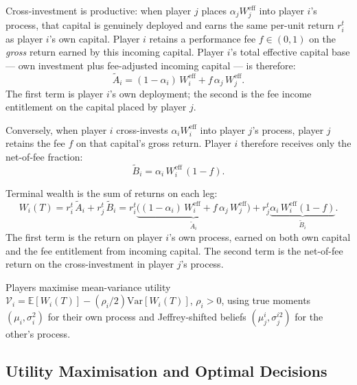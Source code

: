 \documentclass[12pt,a4paper]{article}
\newcommand{\E}{\mathbb{E}}
\newcommand{\Var}{\mathrm{Var}}
\newcommand{\1}{\mathbf{1}}
\begin{document}
Cross-investment is productive: when player $j$ places
$\alpha_j W_j^{\mathrm{eff}}$ into player $i$'s process, that
capital is genuinely deployed and earns the same per-unit return
$r_i^t$ as player $i$'s own capital. Player $i$ retains a
performance fee $f \in (0,1)$ on the \emph{gross} return earned
by this incoming capital. Player $i$'s total effective capital
base --- own investment plus fee-adjusted incoming capital ---
is therefore:
\begin{equation}
  \tilde{A}_i = (1-\alpha_i)\,W_i^{\mathrm{eff}}
                + f\,\alpha_j\,W_j^{\mathrm{eff}}.
  \label{eq:Atilde}
\end{equation}
The first term is player $i$'s own deployment; the second is the
fee income entitlement on the capital placed by player $j$.

Conversely, when player $i$ cross-invests $\alpha_i W_i^{\mathrm{eff}}$
into player $j$'s process, player $j$ retains the fee $f$ on
that capital's gross return. Player $i$ therefore receives only
the net-of-fee fraction:
\begin{equation}
  \tilde{B}_i = \alpha_i\,W_i^{\mathrm{eff}}\,(1-f).
  \label{eq:Btilde}
\end{equation}

Terminal wealth is the sum of returns on each leg:
\begin{equation}
  W_i(T) = r_i^t\,\tilde{A}_i + r_j^t\,\tilde{B}_i
          = r_i^t\!\underbrace{\bigl((1-\alpha_i)\,W_i^{\mathrm{eff}}
              + f\,\alpha_j\,W_j^{\mathrm{eff}}\bigr)}_{\tilde{A}_i}
          + r_j^t\!\underbrace{\alpha_i\,W_i^{\mathrm{eff}}(1-f)}_{\tilde{B}_i}.
  \label{eq:wealth}
\end{equation}
The first term is the return on player $i$'s own process, earned
on both own capital and the fee entitlement from incoming capital.
The second term is the net-of-fee return on the cross-investment
in player $j$'s process.

Players maximise mean-variance utility
$\mathcal{V}_i = \E[W_i(T)] - (\rho_i/2)\Var[W_i(T)]$,
$\rho_i > 0$, using true moments $(\mu_i, \sigma_i^2)$ for their
own process and Jeffrey-shifted beliefs $(\mu_j^i, \sigma_j^{i2})$
for the other's process.

\subsection{Utility Maximisation and Optimal Decisions}
\label{sec:optimisation}
\end{document}
